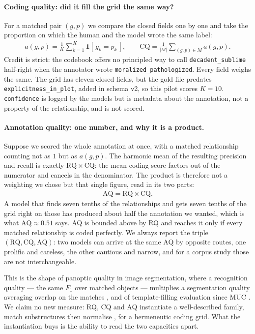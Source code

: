 \paragraph{Coding quality: did it fill the grid the same way?} For a matched
pair $(g,p)$ we compare the closed fields one by one and take the proportion on
which the human and the model wrote the same label:
%
\begin{align}
a(g,p) = \frac{1}{K} \sum_{k=1}^{K} \mathbf{1}\!\left[\, g_k = p_k \,\right] ,
\qquad
\mathrm{CQ} = \frac{1}{|M|} \sum_{(g,p) \in M} a(g,p) .
\end{align}
%
Credit is strict: the codebook offers no principled way to call
\texttt{decadent\_sublime} half-right when the annotator wrote
\texttt{moralized\_pathologized}. Every field weighs the same. The grid has
eleven closed fields, but the gold file predates \texttt{explicitness\_in\_plot},
added in schema v2, so this pilot scores $K = 10$. \texttt{confidence} is logged
by the models but is metadata about the annotation, not a property of the
relationship, and is not scored.

\paragraph{Annotation quality: one number, and why it is a product.} Suppose we
scored the whole annotation at once, with a matched relationship counting not as
$1$ but as $a(g,p)$. The harmonic mean of the resulting precision and recall is
exactly $\mathrm{RQ} \times \mathrm{CQ}$: the mean coding score factors out of
the numerator and cancels in the denominator. The product is therefore not a
weighting we chose but that single figure, read in its two parts:
%
\begin{align}
\mathrm{AQ} = \mathrm{RQ} \times \mathrm{CQ} .
\end{align}
%
A model that finds seven tenths of the relationships and gets seven tenths of
the grid right on those has produced about half the annotation we wanted, which
is what $\mathrm{AQ} \approx 0.51$ says. AQ is bounded above by RQ and reaches
it only if every matched relationship is coded perfectly. We always report the
triple $(\mathrm{RQ}, \mathrm{CQ}, \mathrm{AQ})$: two models can arrive at the
same AQ by opposite routes, one prolific and careless, the other cautious and
narrow, and for a corpus study those are not interchangeable.

This is the shape of panoptic quality in image segmentation, where a recognition
quality --- the same $F_1$ over matched objects --- multiplies a segmentation
quality averaging overlap on the matches \cite{kirillov2019panoptic}, and of
template-filling evaluation since MUC \cite{chinchor1992muc4}. We claim no new
measure: RQ, CQ and AQ instantiate a well-described family, match substructures
then normalise \cite{chen2023unified}, for a hermeneutic coding grid. What the
instantiation buys is the ability to read the two capacities apart.

